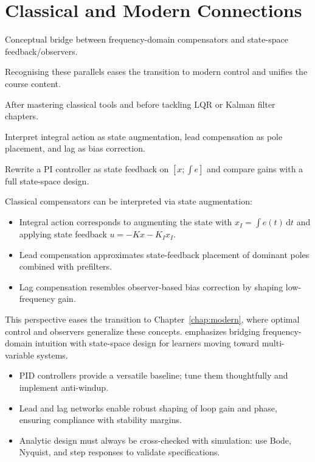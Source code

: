 \section{Classical and Modern Connections}
\begin{beginnerguide}
    \item[\textbf{What?}] Conceptual bridge between frequency-domain compensators and state-space feedback/observers.
    \item[\textbf{Why?}] Recognising these parallels eases the transition to modern control and unifies the course content.
    \item[\textbf{When?}] After mastering classical tools and before tackling LQR or Kalman filter chapters.
    \item[\textbf{How?}] Interpret integral action as state augmentation, lead compensation as pole placement, and lag as bias correction.
    \item[\textbf{Example}] Rewrite a PI controller as state feedback on $[x; \int e]$ and compare gains with a full state-space design.
\end{beginnerguide}
Classical compensators can be interpreted via state augmentation:
\begin{itemize}[leftmargin=*]
    \item Integral action corresponds to augmenting the state with $x_I = \int e(t)\,\mathrm{d}t$ and applying state feedback $u = -K x - K_I x_I$.
    \item Lead compensation approximates state-feedback placement of dominant poles combined with prefilters.
    \item Lag compensation resembles observer-based bias correction by shaping low-frequency gain.
\end{itemize}
This perspective eases the transition to Chapter~\ref{chap:modern}, where optimal control and observers generalize these concepts. \textcite{ljung2012control} emphasizes bridging frequency-domain intuition with state-space design for learners moving toward multi-variable systems.

\begin{takeaway}
\begin{itemize}[leftmargin=*]
    \item PID controllers provide a versatile baseline; tune them thoughtfully and implement anti-windup.
    \item Lead and lag networks enable robust shaping of loop gain and phase, ensuring compliance with stability margins.
    \item Analytic design must always be cross-checked with simulation: use Bode, Nyquist, and step responses to validate specifications.
\end{itemize}
\end{takeaway}

